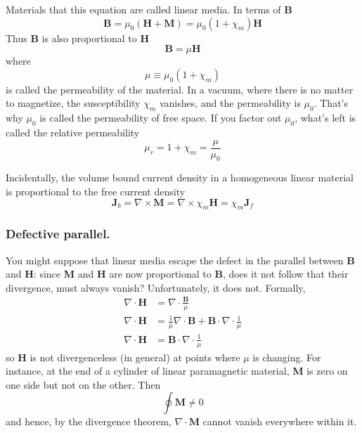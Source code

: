 \documentclass[../../../main.tex]{subfiles}
\begin{document}
Materials that this equation are called linear media. In terms of \textbf{B}
\begin{equation*}
    \mathbf{B} = \mu_0(\mathbf{H} + \mathbf{M}) = \mu_0(1 + \chi_m )\mathbf{H}
\end{equation*}
Thus \textbf{B} is also proportional to \textbf{H}
\begin{equation*}
    \mathbf{B}=\mu\mathbf{H}
\end{equation*}
where
\begin{equation*}
    \mu\equiv\mu_0(1 + \chi_m )
\end{equation*}
is called the permeability of the material. In a vacuum, where there is no matter to magnetize, the susceptibility $\chi_m$ vanishes, and the permeability is $\mu_0$. That’s why $\mu_0$ is called the permeability of free space. If you factor out $\mu_0$, what’s left is called the relative permeability
\begin{equation*}
    \mu_r=1 + \chi_m=\frac{\mu}{\mu_0}
\end{equation*}

Incidentally, the volume bound current density in a homogeneous linear material is proportional to the free current density
\begin{equation*}
    \mathbf{J}_b=\nabla\times \mathbf{M}=\nabla\times \chi_m \mathbf{H}=\chi_m\mathbf{J}_f
\end{equation*}

\subsubsection*{Defective parallel.} You might suppose that linear media escape the defect in the parallel between \textbf{B} and \textbf{H}: since \textbf{M} and \textbf{H} are now proportional to \textbf{B}, does it not follow that their divergence, must always vanish? Unfortunately, it does not. Formally,
\begin{align*}
    \nabla\cdot\mathbf{H}&= \nabla\cdot\frac{\mathbf{B}}{\mu}\\
    \nabla\cdot\mathbf{H}&=\frac{1}{\mu}\nabla\cdot\mathbf{B}+\mathbf{B}\cdot\nabla\cdot\frac{1}{\mu}\\
    \nabla\cdot\mathbf{H}&=\mathbf{B}\cdot\nabla\cdot\frac{1}{\mu}
\end{align*}
so \textbf{H} is not divergenceless (in general) at points where $\mu$ is changing. For instance, at the end of a cylinder of linear paramagnetic material, \textbf{M} is zero on one side but not on the other. Then 
\begin{equation*}
    \oint\mathbf{M}\neq 0
\end{equation*}
and hence, by the divergence theorem, $\nabla\cdot\mathbf{M}$ cannot vanish everywhere within it.
\end{document}
